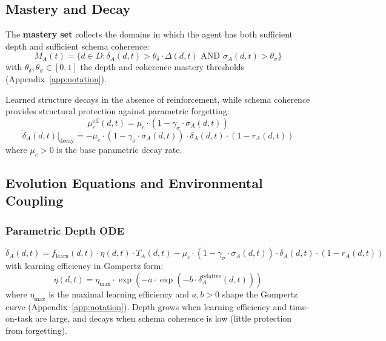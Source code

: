 \documentclass{article}
\theoremstyle{definition}
\begin{document}
\subsection{Mastery and Decay}\label{sec:mastery-set}

The \textbf{mastery set} collects the domains in which the agent has
both sufficient depth and sufficient schema coherence:
\begin{equation}\label{eq:mastery-set}
M_A(t) = \{d \in D : \delta_A(d,t) > \theta_{\delta} \cdot \Delta(d,t) \text{ AND } \sigma_A(d,t) > \theta_{\sigma}\}
\end{equation}
with $\theta_{\delta}, \theta_{\sigma} \in [0,1]$ the depth and
coherence mastery thresholds (Appendix~\ref{app:notation}).

Learned structure decays in the absence of reinforcement, while schema coherence provides structural protection against parametric forgetting:
\begin{equation}\label{eq:effective-decay}
\mu_c^{\text{eff}}(d,t) = \mu_c \cdot (1 - \gamma_\sigma \cdot \sigma_A(d,t))
\end{equation}
\begin{equation}\label{eq:depth-decay}
\dot{\delta}_A(d,t)\big|_{\text{decay}} = -\mu_c \cdot (1 - \gamma_\sigma \cdot \sigma_A(d,t)) \cdot \delta_A(d,t) \cdot (1 - r_A(d,t))
\end{equation}
where $\mu_c > 0$ is the base parametric decay rate.

\subsection{Evolution Equations and Environmental Coupling}\label{sec:evolution-equations}

\subsubsection{Parametric Depth ODE}
\begin{equation}\label{eq:depth-ode}
\dot{\delta}_A(d,t) = f_{\text{learn}}(d,t) \cdot \eta(d,t) \cdot T_A(d,t) - \mu_c \cdot (1 - \gamma_\sigma \cdot \sigma_A(d,t)) \cdot \delta_A(d,t) \cdot (1 - r_A(d,t))
\end{equation}
with learning efficiency in Gompertz form:
\begin{equation}\label{eq:gompertz}
\eta(d,t) = \eta_{\text{max}} \cdot \exp(-a \cdot \exp(-b \cdot \delta_A^{\text{relative}}(d,t)))
\end{equation}
where $\eta_{\max}$ is the maximal learning efficiency and
$a, b > 0$ shape the Gompertz curve (Appendix~\ref{app:notation}).
Depth grows when learning efficiency and time-on-task are large, and
decays when schema coherence is low (little protection from forgetting).
\end{document}
